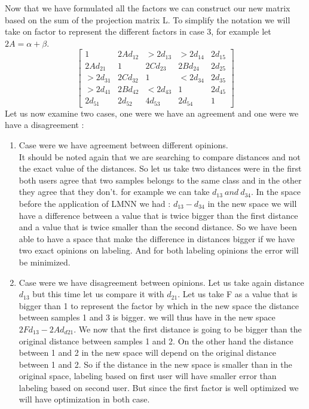 \documentclass[hidelinks,12pt]{report}
\begin{document}
\begin{enumerate}
Now that we have formulated all the factors we can construct our new matrix based on the sum of the projection matrix L. To simplify the notation we will take on factor to represent the different factors in case 3, for example let $2A=\alpha+\beta$.
\[
\begin{bmatrix}
1            & 2Ad_{12} & >2d_{13}  & >2d_{14} & 2d_{15} \\
2Ad_{21}     & 1        & 2Cd_{23}  & 2Bd_{24} & 2d_{25} \\
>2d_{31}     & 2Cd_{32} & 1         & <2d_{34} & 2d_{35} \\
>2d_{41}     & 2Bd_{42} & <2d_{43}  & 1        & 2d_{45} \\
2d_{51}      & 2d_{52}  & 4d_{53}   & 2d_{54}  & 1
\end{bmatrix}
\]
Let us now examine two cases, one were we have an agreement and one were we have a disagreement :
\begin{enumerate}
\item Case were we have agreement between different opinions.\\
It should be noted again that we are searching to compare distances and not the exact value of the distances. So let us take two distances were in the first both users agree that two samples belongs to the same class and in the other they agree that they don't.  for example we can take $d_{13} \ and \ d_{34}$. In the space before the application of LMNN we had : $d_{13}-d_{34}$ in the new space we will have a difference between a value that is twice bigger than the first distance and a value that is twice smaller than the second distance. So we have been able to have a space that make the difference in distances bigger if we have two exact opinions on labeling. And for both labeling opinions the error will be minimized.
\item Case were we have disagreement between opinions.
Let us take again distance $d_13$ but this time let us compare it with $d_21$. Let us take F as a value that is bigger than 1 to represent the factor by which in the new space the distance between samples 1 and 3 is bigger. we will thus have in the new space $2Fd_{13}-2Ad_{d21}$. We now that the first distance is going to be bigger than the original distance between samples 1 and 2. On the other hand the distance between 1 and 2 in the new space will depend on the original distance between 1 and 2. So if the distance in the new space is smaller than in the original space, labeling based on first user will have smaller error than labeling based on second user. But since the first factor is well optimized we will have optimization in both case. \\

\end{enumerate}
\end{enumerate}
\end{document}
